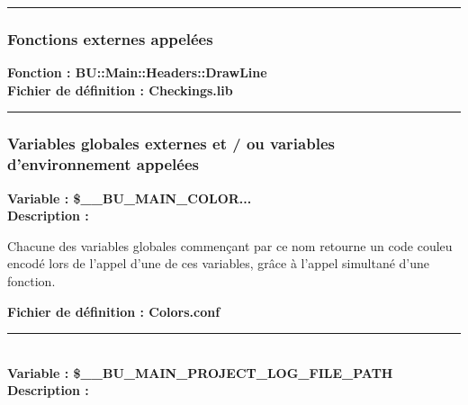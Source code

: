 \documentclass[a4paper,10pt]{article}
\begin{document}
\setlength{\parskip}{2em}


\color{sec3}\par\noindent\rule{\textwidth}{0.4pt}\color{text}\setlength{\parskip}{1em}

\color{sec3}
\subsubsection{Fonctions externes appelées}\color{text}

\textbf{Fonction : \color{mauve}BU::Main::Headers::DrawLine}\\[1\baselineskip]

\textbf{Fichier de définition : \color{lime}Checkings.lib}\\[1\baselineskip]



\color{sec3}\par\noindent\rule{\textwidth}{0.4pt}\color{text}

\color{sec3}
\subsubsection{Variables globales externes et / ou variables d'environnement appelées}\color{text}

\textbf{Variable : \color{vars}\$\_\_BU\_MAIN\_COLOR...}\\[1\baselineskip]

\textbf{Description :}

\begin{justify}
    Chacune des variables globales commençant par ce nom retourne un code couleu encodé lors de l'appel d'une de ces variables, grâce à l'appel simultané d'une fonction.
\end{justify}

\textbf{Fichier de définition : \color{lime}Colors.conf}\\[1\baselineskip]



\color{vars}\par\noindent\rule{\textwidth}{0.4pt}\color{text}\\[1\baselineskip]

\textbf{Variable : \color{vars}\$\_\_BU\_MAIN\_PROJECT\_LOG\_FILE\_PATH}\\[1\baselineskip]

\textbf{Description :}
\end{document}
